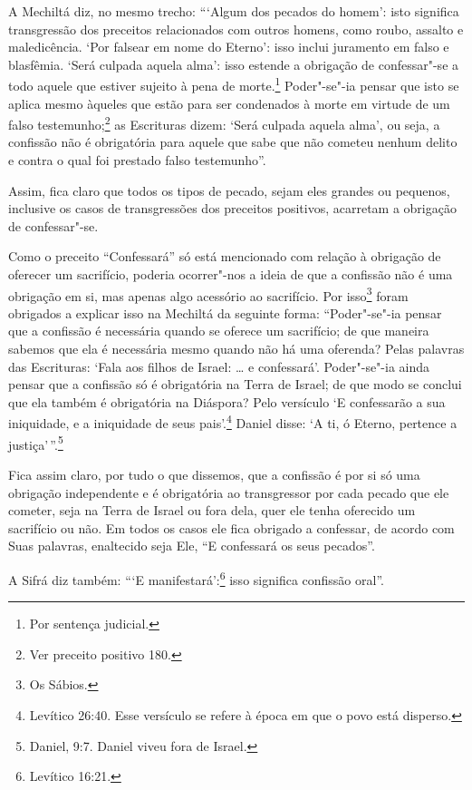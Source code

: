 \begin{multicols}{2}
A Mechiltá\starr{} diz, no mesmo trecho: ```Algum dos pecados do homem': isto
significa transgressão dos preceitos relacionados com outros homens,
como roubo, assalto e maledicência. `Por falsear em nome do Eterno':
isso inclui juramento em falso e blasfêmia. `Será culpada aquela alma': isso estende a obrigação de confessar"-se a todo aquele que estiver
sujeito à pena de morte.\footnote{Por sentença judicial.} Poder"-se"-ia pensar que
isto se aplica mesmo àqueles que estão para ser condenados à morte em
virtude de um falso testemunho;\footnote{Ver preceito positivo 180.} as Escrituras
dizem: `Será culpada aquela alma', ou seja, a confissão não é obrigatória para
aquele que sabe que não cometeu nenhum delito e contra o qual foi prestado falso
testemunho''.

Assim, fica claro que todos os tipos de pecado, sejam eles grandes ou
pequenos, inclusive os casos de transgressões dos preceitos positivos,
acarretam a obrigação de confessar"-se.

Como o preceito ``Confessará'' só está mencionado com relação à
obrigação de oferecer um sacrifício, poderia ocorrer"-nos a ideia de que
a confissão não é uma obrigação em si, mas apenas algo acessório ao
sacrifício. Por isso\footnote{Os Sábios.} foram obrigados a explicar
isso na Mechiltá\starr{} da seguinte forma: ``Poder"-se"-ia pensar que a
confissão é necessária quando se oferece um sacrifício; de
que maneira sabemos que ela é necessária mesmo quando não há uma
oferenda? Pelas palavras das Escrituras: `Fala aos filhos de Israel: \ldots{} e confessará'. Poder"-se"-ia ainda pensar que a confissão só é
obrigatória na Terra de Israel; de que modo se conclui que ela também é
obrigatória na Diáspora? Pelo versículo `E confessarão a sua iniquidade, e a iniquidade de seus pais'.\footnote{Levítico 26:40. Esse versículo se refere à época em que o povo está disperso.} Daniel disse: `A ti, ó Eterno, pertence a justiça'\,''.\footnote{Daniel, 9:7. Daniel viveu fora de Israel.}

Fica assim claro, por tudo o que dissemos, que a confissão é por si
só uma obrigação independente e é obrigatória ao transgressor por cada
pecado que ele cometer, seja na Terra de Israel ou fora dela, quer ele
tenha oferecido um sacrifício ou não. Em todos os casos ele fica
obrigado a confessar, de acordo com Suas palavras, enaltecido seja Ele,
``E confessará os seus pecados''.

A Sifrá\starr{} diz também: ```E manifestará':\footnote{Levítico 16:21.} isso significa confissão oral''.


\end{multicols}
